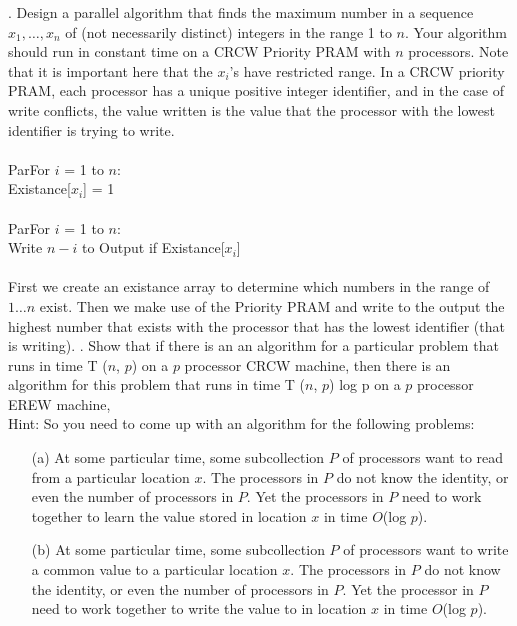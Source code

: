 \documentclass[10pt]{article}
\newcommand{\tab}{\hspace*{2em}}
\begin{document}
. Design a parallel algorithm that finds the maximum number in a sequence $x_1, \ldots ,x_n$ of (not necessarily
distinct) integers in the range 1 to $n$. Your algorithm should run in constant time on a CRCW Priority
PRAM with $n$ processors. Note that it is important here that the $x_i$'s have restricted range. In a
CRCW priority PRAM, each processor has a unique positive integer identifier, and in the case of write
conflicts, the value written is the value that the processor with the lowest identifier is trying to write.\\
\\
ParFor $i$ = 1 to $n$:\\
\tab Existance[$x_i$] = 1\\
\\
ParFor $i$ = 1 to $n$:\\
\tab Write $n-i$ to Output if Existance[$x_i$]\\
\\
First we create an existance array to determine which numbers in the range of $1 \ldots n$ exist. Then we make use
of the Priority PRAM and write to the output the highest number that exists with the processor that has the lowest
identifier (that is writing).  
. Show that if there is an an algorithm for a particular problem that runs in time T ($n$, $p$) on a $p$
processor CRCW machine, then there is an algorithm for this problem that runs in time T ($n$, $p$) log p
on a $p$ processor EREW machine,\\
Hint: So you need to come up with an algorithm for the following problems:
\begin{enumerate}
	\item[(a)] At some particular time, some subcollection $P$ of processors want to read from a particular location
	$x$. The processors in $P$ do not know the identity, or even the number of processors in $P$. Yet the
	processors in $P$ need to work together to learn the value stored in location $x$ in time $O$(log $p$).
	\item[(b)] At some particular time, some subcollection $P$ of processors want to write a common value to
	a particular location $x$. The processors in $P$ do not know the identity, or even the number of
	processors in $P$. Yet the processor in $P$ need to work together to write the value to in location $x$
	in time $O$(log $p$).
\end{enumerate}
\end{document}
